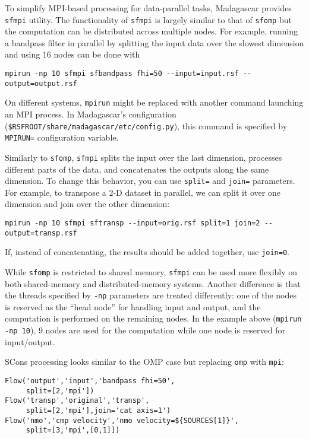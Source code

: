 To simplify MPI-based processing for data-parallel tasks, Madagascar
provides \texttt{sfmpi} utility. The functionality of \texttt{sfmpi}
is largely similar to that of \texttt{sfomp} but the computation can
be distributed across multiple nodes. For example, running a bandpass
filter in parallel by splitting the input data over the slowest
dimension and using 16 nodes can be done with
\begin{verbatim}
mpirun -np 10 sfmpi sfbandpass fhi=50 --input=input.rsf --output=output.rsf
\end{verbatim}
On different systems, \texttt{mpirun} might be replaced with another
command launching an MPI process. In Madagascar's configuration
(\texttt{\$RSFROOT/share/madagascar/etc/config.py}), this command is
specified by \texttt{MPIRUN=} configuration variable.

Similarly to \texttt{sfomp}, \texttt{sfmpi} splits the input over the last dimension,
processes different parts of the data, and concatenates the outputs
along the same dimension. To change this behavior, you can use
\texttt{split=} and \texttt{join=} parameters. For example, to
transpose a 2-D dataset in parallel, we can split it over one
dimension and join over the other dimension:
\begin{verbatim}
mpirun -np 10 sfmpi sftransp --input=orig.rsf split=1 join=2 --output=transp.rsf
\end{verbatim}
If, instead of concatenating, the results should be added together, use \texttt{join=0}.

While \texttt{sfomp} is restricted to shared memory, \texttt{sfmpi}
can be used more flexibly on both shared-memory and distributed-memory
systems. Another difference is that the threads specified by
\texttt{-np} parameters are treated differently: one of the nodes is
reserved as the ``head node'' for handling input and output, and the
computation is performed on the remaining nodes. In the example above
(\texttt{mpirun -np 10}), 9 nodes are used for the computation while
one node is reserved for input/output.

SCons processing looks similar to the OMP case but replacing \texttt{omp} with \texttt{mpi}:
\lstset{language=python,showstringspaces=false,frame=single}
\begin{lstlisting}
Flow('output','input','bandpass fhi=50',
     split=[2,'mpi'])
Flow('transp','original','transp',
     split=[2,'mpi'],join='cat axis=1')
Flow('nmo','cmp velocity','nmo velocity=${SOURCES[1]}',
     split=[3,'mpi',[0,1]])
\end{lstlisting}

